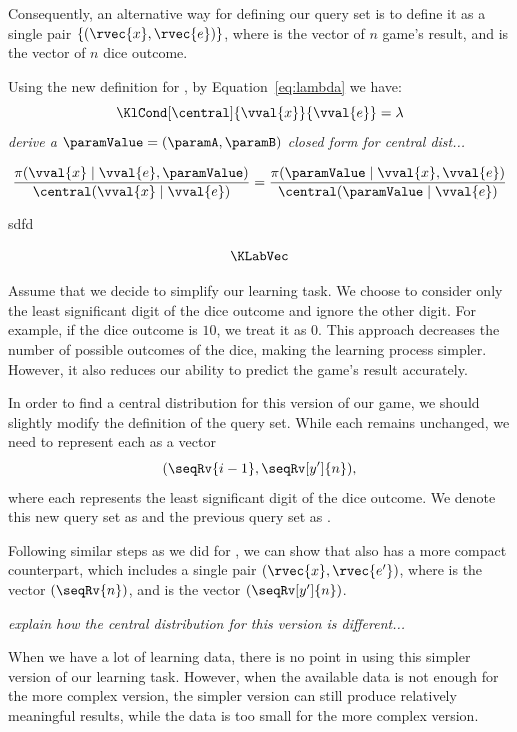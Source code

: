Consequently, an alternative way for defining our query set is to define it as a single
pair $\left\{(\rvec{x}, \rvec{e})\right\}$, where  is the vector of $n$ game's result, and  is the vector of $n$
dice outcome.

Using the new definition for , by Equation~\ref{eq:lambda} we have:
\begin{equation*}
    \KlCond[\central]{\vval{x}}{\vval{e}} = \lambda
\end{equation*}
\emph{derive a $\paramValue = (\paramA, \paramB)$ closed form for central dist...}

\[
    \frac{\pi(\vval{x} \mid \vval{e}, \paramValue)}{\central(\vval{x} \mid \vval{e})}
    = \frac{\pi(\paramValue \mid \vval{x}, \vval{e})}{\central(\paramValue \mid \vval{e})}
\]

sdfd

\[
    \KLabVec
\]

Assume that we decide to simplify our learning task.
We choose to consider only the least significant digit of the dice outcome and ignore the other digit.
For example, if the dice outcome is $10$, we treat it as $0$.
This approach decreases the number of possible outcomes of the dice, making the learning process simpler.
However, it also reduces our ability to predict the game’s result accurately.

In order to find a central distribution for this version of our game, we should slightly modify the definition of the
query set.
While each \Qvar remains unchanged, we need to represent each  as a vector
\[
    (\seqRv{i-1}, \seqRv[y']{n}),
\]
where each  represents the least significant digit of the dice outcome.
We denote this new query set as  and the previous query set as .

Following similar steps as we did for , we can show that  also has a more compact counterpart,
which includes a single pair $(\rvec{x}, \rvec{e'})$, where  is the vector $(\seqRv{n})$, and  is
the vector
$(\seqRv[y']{n})$.

\emph{explain how the central distribution for this version is different...}

When we have a lot of learning data, there is no point in using this simpler version of our learning task.
However, when the available data is not enough for the more complex version, the simpler version can still produce
relatively meaningful results,
while the data is too small for the more complex version.

